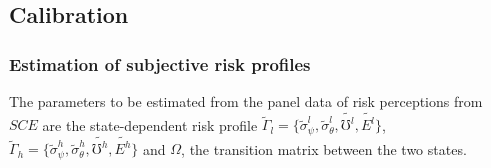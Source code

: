 \begin{comment}

\begin{center}
[FIGURE \ref{fig:comparison1} HERE]
\end{center}

Figure \ref{fig:comparison2} further compares the objective model under transitory unemployment risks versus the subjective model in which employment status leads to additional extrapolations in risk perceptions. Specifically, the latter model lets an unemployed worker be with the high-risk perceptions while the employed to be with the low-risk perceptions. This essentially makes the transition matrix $\Omega$ exactly equal to $\Pi$. I also configure risk parameters specific to each state such that on average it preserves the same size of permanent and transitory risks compared to the objective model. This guarantees the difference between the two model is not induced by change in the average degree of precautionary saving motives. 

\begin{center}
[FIGURE \ref{fig:comparison2} HERE]
\end{center}

The most obvious pattern seen in the figure is that within the objective model, unemployed workers have less consumption than employed workers. In addition, between the objective and subjective-extrapolation model, an employed worker with lower risk perceptions actually consume less than the employed worker in the objective model. 
\end{comment}

\subsection{Calibration}


\subsubsection{Estimation of subjective risk profiles}

The parameters to be estimated from the panel data of risk perceptions from $SCE$ are the state-dependent risk profile $\tilde \Gamma_l=\{\tilde \sigma^l_\psi,\tilde \sigma^l_\theta, \tilde{\mho^l}, \tilde{E^l}\}$, $\tilde \Gamma_h =\{\tilde \sigma^h_\psi,\tilde \sigma^h_\theta, \tilde{\mho^h}, \tilde{E^h}\}$ and $\Omega$, the transition matrix between the two states.

